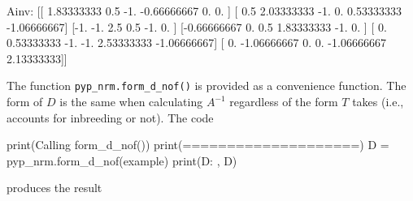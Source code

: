 \documentclass[
  letterpaper,
  DIV=11,
  numbers=noendperiod]{scrreprt}
\newenvironment{Shaded}{\begin{snugshade}}{\end{snugshade}}
\newcommand{\BuiltInTok}[1]{\textcolor[rgb]{0.00,0.23,0.31}{#1}}
\newcommand{\FloatTok}[1]{\textcolor[rgb]{0.68,0.00,0.00}{#1}}
\newcommand{\NormalTok}[1]{\textcolor[rgb]{0.00,0.23,0.31}{#1}}
\newcommand{\OperatorTok}[1]{\textcolor[rgb]{0.37,0.37,0.37}{#1}}
\newcommand{\StringTok}[1]{\textcolor[rgb]{0.13,0.47,0.30}{#1}}
\begin{document}
\begin{Shaded}
\begin{Highlighting}[]
\NormalTok{Ainv:  [[ }\FloatTok{1.83333333}  \FloatTok{0.5}        \OperatorTok{{-}}\FloatTok{1.}         \OperatorTok{{-}}\FloatTok{0.66666667}  \FloatTok{0.}          \FloatTok{0.}\NormalTok{        ]}
\NormalTok{ [ }\FloatTok{0.5}         \FloatTok{2.03333333} \OperatorTok{{-}}\FloatTok{1.}          \FloatTok{0.}          \FloatTok{0.53333333} \OperatorTok{{-}}\FloatTok{1.06666667}\NormalTok{]}
\NormalTok{ [}\OperatorTok{{-}}\FloatTok{1.}         \OperatorTok{{-}}\FloatTok{1.}          \FloatTok{2.5}         \FloatTok{0.5}        \OperatorTok{{-}}\FloatTok{1.}          \FloatTok{0.}\NormalTok{        ]}
\NormalTok{ [}\OperatorTok{{-}}\FloatTok{0.66666667}  \FloatTok{0.}          \FloatTok{0.5}         \FloatTok{1.83333333} \OperatorTok{{-}}\FloatTok{1.}          \FloatTok{0.}\NormalTok{        ]}
\NormalTok{ [ }\FloatTok{0.}          \FloatTok{0.53333333} \OperatorTok{{-}}\FloatTok{1.}         \OperatorTok{{-}}\FloatTok{1.}          \FloatTok{2.53333333} \OperatorTok{{-}}\FloatTok{1.06666667}\NormalTok{]}
\NormalTok{ [ }\FloatTok{0.}         \OperatorTok{{-}}\FloatTok{1.06666667}  \FloatTok{0.}          \FloatTok{0.}         \OperatorTok{{-}}\FloatTok{1.06666667}  \FloatTok{2.13333333}\NormalTok{]]}
\end{Highlighting}
\end{Shaded}

The function \texttt{pyp\_nrm.form\_d\_nof()} is provided as a
convenience function. The form of \(D\) is the same when calculating
\(A^{-1}\) regardless of the form \(T\) takes (i.e., accounts for
inbreeding or not). The code

\begin{Shaded}
\begin{Highlighting}[]
\BuiltInTok{print}\NormalTok{(}\StringTok{\textquotesingle{}Calling form\_d\_nof()\textquotesingle{}}\NormalTok{)}
\BuiltInTok{print}\NormalTok{(}\StringTok{\textquotesingle{}====================\textquotesingle{}}\NormalTok{)}
\NormalTok{D  }\OperatorTok{=}\NormalTok{ pyp\_nrm.form\_d\_nof(example)}
\BuiltInTok{print}\NormalTok{(}\StringTok{\textquotesingle{}D: \textquotesingle{}}\NormalTok{, D)}
\end{Highlighting}
\end{Shaded}

produces the result
\end{document}
